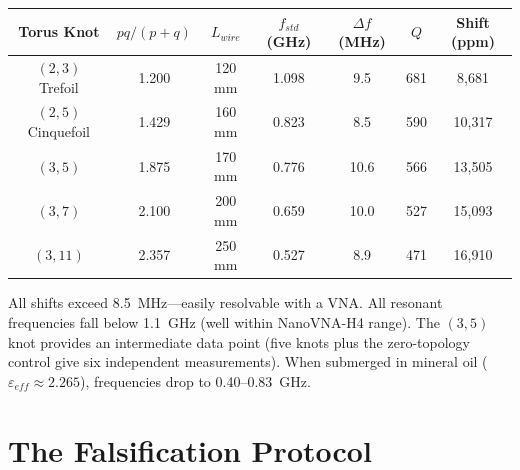 \begin{center}
\begin{tabular}{|c|c|c|c|c|c|c|}
\hline
Torus Knot & $pq/(p{+}q)$ & $L_{wire}$ & $f_{std}$ (GHz) & $\Delta f$ (MHz) & $Q$ & Shift (ppm) \\ \hline
$(2,3)$ Trefoil    & 1.200 & 120 mm & 1.098 &  9.5 & 681 & 8{,}681  \\
$(2,5)$ Cinquefoil & 1.429 & 160 mm & 0.823 &  8.5 & 590 & 10{,}317 \\
$(3,5)$            & 1.875 & 170 mm & 0.776 &  10.6 & 566 & 13{,}505 \\
$(3,7)$            & 2.100 & 200 mm & 0.659 & 10.0 & 527 & 15{,}093 \\
$(3,11)$           & 2.357 & 250 mm & 0.527 &  8.9 & 471 & 16{,}910 \\ \hline
\end{tabular}
\end{center}

All shifts exceed 8.5~MHz---easily resolvable with a VNA. All resonant frequencies fall below 1.1~GHz (well within NanoVNA-H4 range). The $(3,5)$ knot provides an intermediate data point (five knots plus the zero-topology control give six independent measurements). When submerged in mineral oil ($\varepsilon_{eff} \approx 2.265$), frequencies drop to 0.40--0.83~GHz.

\section{The Falsification Protocol}

